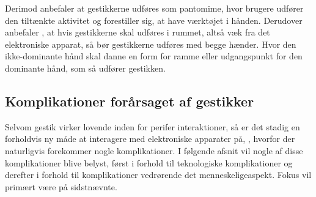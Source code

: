 Derimod anbefaler \textcite[s. 823]{PDF:UnderstandingNaturalness} at gestikkerne udføres som pantomime, hvor brugere udfører den tiltænkte aktivitet og forestiller sig, at have værktøjet i hånden. Derudover anbefaler \textcite[s. 824]{PDF:UnderstandingNaturalness}, at hvis gestikkerne skal udføres i rummet, altså væk fra det elektroniske apparat, så bør gestikkerne udføres med begge hænder. Hvor den ikke-dominante hånd skal danne en form for ramme eller udgangspunkt for den dominante hånd, som så udfører gestikken.      
%
\subsection{Komplikationer forårsaget af gestikker}
\label{KomplikationerGestikker}
%
Selvom gestik virker lovende inden for perifer interaktioner, så er det stadig en forholdvis ny måde at interagere med elektroniske apparater på, \parencite[s. 163]{PDF:ComparingInputModalities}, hvorfor der naturligvis forekommer nogle komplikationer. I følgende afsnit vil nogle af disse komplikationer blive belyst, først i forhold til teknologiske komplikationer og derefter i forhold til komplikationer vedrørende det menneskeligeaspekt. Fokus vil primært være på sidstnævnte.
%
